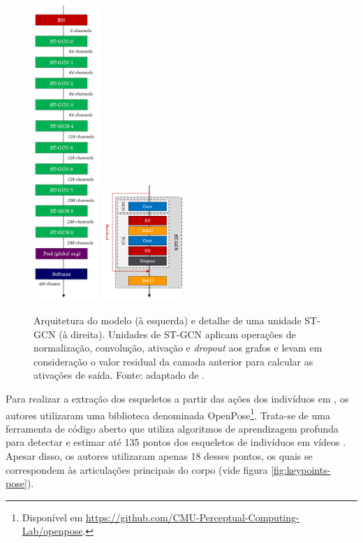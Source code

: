 \begin{figure}[ht]
    \centering
    \includegraphics[width=2.5cm]{images/st_gcn_architecture}
    \includegraphics[width=3.0cm]{images/st_gcn_architeture_unit}
    \caption{Arquitetura do modelo (à esquerda) e detalhe de uma unidade ST-GCN (à direita). Unidades de ST-GCN aplicam operações de normalização, convolução, ativação e \textit{dropout} aos grafos e levam em consideração o valor residual da camada anterior para calcular as ativações de saída. Fonte: adaptado de \cite{st-gcn-2018}.}
    \label{fig:st-gcn-architecture}
\end{figure}


Para realizar a extração dos esqueletos a partir das ações dos indivíduos em \cite{st-gcn-2018}, os autores utilizaram uma biblioteca denominada OpenPose\footnote{
    Disponível em \url{https://github.com/CMU-Perceptual-Computing-Lab/openpose}.
}. Trata-se de uma ferramenta de código aberto que utiliza algoritmos de aprendizagem profunda para detectar e estimar até 135 pontos dos esqueletos de indivíduos em vídeos \cite{cao-realtime-2017, simon-hand-2017, wei-cpm-2016}. Apesar disso, os autores utilizaram apenas 18 desses pontos, os quais se correspondem às articulações principais do corpo (vide figura \ref{fig:keypoints-pose}). 

